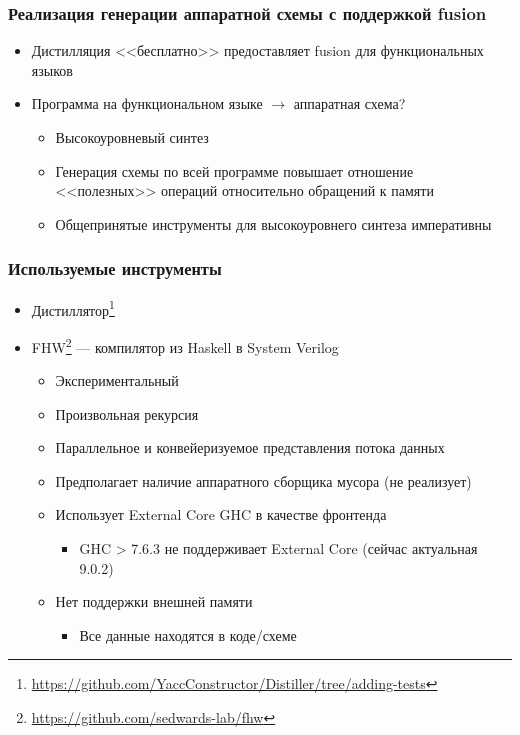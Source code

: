 \documentclass[xcolor=table,aspectratio=169]{beamer}
\begin{document}
\begin{frame}[fragile] \frametitle{Реализация генерации аппаратной схемы с поддержкой fusion}

    \begin{itemize}
        \item Дистилляция <<бесплатно>> предоставляет fusion для функциональных языков
        \vfill
        \item Программа на функциональном языке $\to$ аппаратная схема? 
        \vfill
        \begin{itemize}
            \item Высокоуровневый синтез
            \vfill
            \item Генерация схемы по всей программе повышает отношение <<полезных>> операций относительно обращений к памяти
            \vfill
            \item Общепринятые инструменты для высокоуровнего синтеза императивны
    \end{itemize}
        
        
    \end{itemize}
      
\end{frame}

\begin{frame}[fragile]\frametitle{Используемые инструменты}

\begin{itemize}
\item Дистиллятор\footnote{\url{https://github.com/YaccConstructor/Distiller/tree/adding-tests}}
\item FHW\footnote{\url{https://github.com/sedwards-lab/fhw}} — компилятор из Haskell в System Verilog
\begin{itemize}
            \item Экспериментальный
            \vfill
            \item Произвольная рекурсия
            \vfill
            \item Параллельное и конвейеризуемое представления потока данных
            \vfill
            \item Предполагает наличие аппаратного сборщика мусора (не реализует)
            \vfill
            \item Использует External Core GHC в качестве фронтенда
            \begin{itemize}
                \item GHC > 7.6.3 не поддерживает External Core (сейчас актуальная 9.0.2)
            \end{itemize}
            \vfill
            \item Нет поддержки внешней памяти
            \vfill
            \begin{itemize}
                \item Все данные находятся в коде/схеме 
            \end{itemize}
        \end{itemize}
\end{itemize}

\end{frame}
\end{document}
